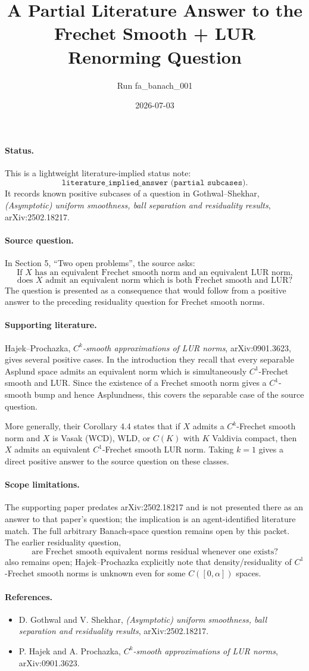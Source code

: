 \documentclass[11pt]{article}
\title{A Partial Literature Answer to the Frechet Smooth + LUR Renorming Question}
\author{Run fa\_banach\_001}
\date{2026-07-03}
\begin{document}
\maketitle

\paragraph{Status.}
This is a lightweight literature-implied status note:
\[
\texttt{literature\_implied\_answer (partial subcases).}
\]
It records known positive subcases of a question in Gothwal--Shekhar,
\emph{(Asymptotic) uniform smoothness, ball separation and residuality results},
arXiv:2502.18217.

\paragraph{Source question.}
In Section 5, ``Two open problems'', the source asks:
\[
\text{If }X\text{ has an equivalent Frechet smooth norm and an equivalent LUR norm,}
\]
\[
\text{does }X\text{ admit an equivalent norm which is both Frechet smooth and LUR?}
\]
The question is presented as a consequence that would follow from a positive
answer to the preceding residuality question for Frechet smooth norms.

\paragraph{Supporting literature.}
Hajek--Prochazka, \emph{\(C^k\)-smooth approximations of LUR norms},
arXiv:0901.3623, gives several positive cases.  In the introduction they recall
that every separable Asplund space admits an equivalent norm which is
simultaneously \(C^1\)-Frechet smooth and LUR.  Since the existence of a
Frechet smooth norm gives a \(C^1\)-smooth bump and hence Asplundness, this
covers the separable case of the source question.

More generally, their Corollary 4.4 states that if \(X\) admits a
\(C^k\)-Frechet smooth norm and \(X\) is Vasak (WCD), WLD, or \(C(K)\) with
\(K\) Valdivia compact, then \(X\) admits an equivalent \(C^1\)-Frechet smooth
LUR norm.  Taking \(k=1\) gives a direct positive answer to the source question
on these classes.

\paragraph{Scope limitations.}
The supporting paper predates arXiv:2502.18217 and is not presented there as an
answer to that paper's question; the implication is an agent-identified
literature match.  The full arbitrary Banach-space question remains open by
this packet.  The earlier residuality question,
\[
\text{are Frechet smooth equivalent norms residual whenever one exists?}
\]
also remains open; Hajek--Prochazka explicitly note that density/residuality of
\(C^1\)-Frechet smooth norms is unknown even for some \(C([0,\alpha])\) spaces.

\paragraph{References.}
\begin{itemize}
\item D. Gothwal and V. Shekhar, \emph{(Asymptotic) uniform smoothness, ball
separation and residuality results}, arXiv:2502.18217.
\item P. Hajek and A. Prochazka, \emph{\(C^k\)-smooth approximations of LUR
norms}, arXiv:0901.3623.
\end{itemize}
\end{document}
